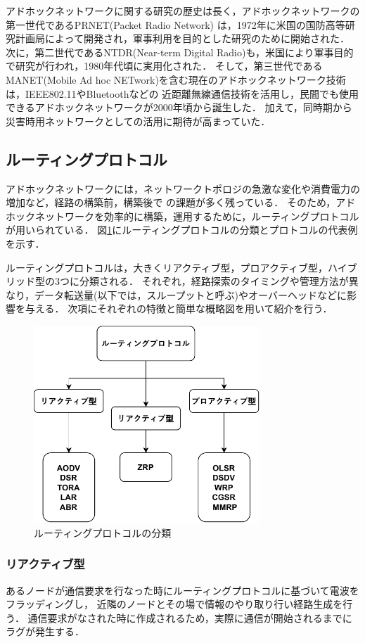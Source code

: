 \documentclass[a4paper, 11pt]{ltjsarticle}
\begin{document}
アドホックネットワークに関する研究の歴史は長く，アドホックネットワークの第一世代であるPRNET(Packet Radio Network)
は，1972年に米国の国防高等研究計画局によって開発され，軍事利用を目的とした研究のために開始された．
次に，第二世代であるNTDR(Near-term Digital Radio)も，米国により軍事目的で研究が行われ，1980年代頃に実用化された．
そして，第三世代であるMANET(Mobile Ad hoc NETwork)を含む現在のアドホックネットワーク技術は，IEEE802.11やBluetoothなどの
近距離無線通信技術を活用し，民間でも使用できるアドホックネットワークが2000年頃から誕生した．
加えて，同時期から災害時用ネットワークとしての活用に期待が高まっていた．

\subsection{ルーティングプロトコル}
アドホックネットワークには，ネットワークトポロジの急激な変化や消費電力の増加など，経路の構築前，構築後で
の課題が多く残っている．
そのため，アドホックネットワークを効率的に構築，運用するために，ルーティングプロトコルが用いられている．
図\ref{routing_classification}にルーティングプロトコルの分類とプロトコルの代表例を示す．

ルーティングプロトコルは，大きくリアクティブ型，プロアクティブ型，ハイブリッド型の3つに分類される．
それぞれ，経路探索のタイミングや管理方法が異なり，データ転送量(以下では，スループットと呼ぶ)やオーバーヘッドなどに影響を与える．
次項にそれぞれの特徴と簡単な概略図を用いて紹介を行う．
\begin{figure}[h]
  \centering
  \includegraphics[width=85mm]{classification_of_routing.pdf}
  \caption{ルーティングプロトコルの分類}
  \label{routing_classification}
\end{figure}

\clearpage
\subsubsection{リアクティブ型}
あるノードが通信要求を行なった時にルーティングプロトコルに基づいて電波をフラッディングし，
近隣のノードとその場で情報のやり取り行い経路生成を行う．
通信要求がなされた時に作成されるため，実際に通信が開始されるまでにラグが発生する．
\end{document}
